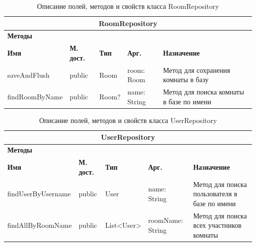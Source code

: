 \documentclass{../includes/TechDoc}
\begin{document}
    \begin{table}[h]
        \caption{\label{tab:class-AuthConfirmView-table}Описание полей, методов и свойств класса RoomRepository}
        \begin{tabularx}{\textwidth}{|l|l|l|l|X|}
            \hline
            \multicolumn{5}{|c|}{RoomRepository} \\ \hline
            \multicolumn{5}{|l|}{\textbf{Методы}} \\ \hline
            \textbf{Имя}   & \textbf{М. дост.} & \textbf{Тип} & \textbf{Арг.} & \textbf{Назначение}                      \\ \hline
            saveAndFlush   & public            & Room         & room: Room    & Метод для сохранения комнаты в базу      \\ \hline
            findRoomByName & public            & Room?        & name: String  & Метод для поиска комнаты в базе по имени \\ \hline
        \end{tabularx}
    \end{table}

    \begin{table}[h]
        \caption{\label{tab:class-AuthConfirmView-table}Описание полей, методов и свойств класса UserRepository}
        \begin{tabularx}{\textwidth}{|l|l|l|l|X|}
            \hline
            \multicolumn{5}{|c|}{UserRepository} \\ \hline
            \multicolumn{5}{|l|}{\textbf{Методы}} \\ \hline
            \textbf{Имя}       & \textbf{М. дост.} & \textbf{Тип} & \textbf{Арг.}    & \textbf{Назначение}                           \\ \hline
            findUserByUsername & public            & User         & name: String     & Метод для поиска пользователя в базе по имени \\ \hline
            findAllByRoomName  & public            & List<User>   & roomName: String & Метод для поиска всех участников комнаты      \\ \hline
        \end{tabularx}
    \end{table}
\end{document}

